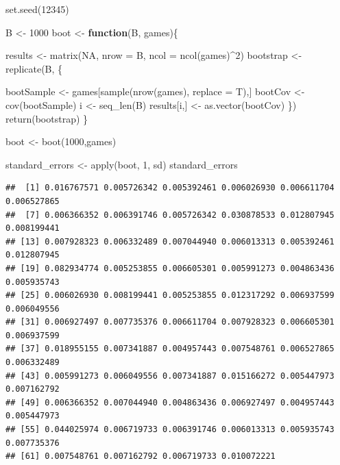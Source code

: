 \documentclass[
]{article}
\newenvironment{Shaded}{\begin{snugshade}}{\end{snugshade}}
\newcommand{\AttributeTok}[1]{\textcolor[rgb]{0.77,0.63,0.00}{#1}}
\newcommand{\ConstantTok}[1]{\textcolor[rgb]{0.00,0.00,0.00}{#1}}
\newcommand{\ControlFlowTok}[1]{\textcolor[rgb]{0.13,0.29,0.53}{\textbf{#1}}}
\newcommand{\DecValTok}[1]{\textcolor[rgb]{0.00,0.00,0.81}{#1}}
\newcommand{\FunctionTok}[1]{\textcolor[rgb]{0.00,0.00,0.00}{#1}}
\newcommand{\NormalTok}[1]{#1}
\newcommand{\OtherTok}[1]{\textcolor[rgb]{0.56,0.35,0.01}{#1}}
\newcommand{\SpecialCharTok}[1]{\textcolor[rgb]{0.00,0.00,0.00}{#1}}
\begin{document}
\begin{Shaded}
\begin{Highlighting}[]
\FunctionTok{set.seed}\NormalTok{(}\DecValTok{12345}\NormalTok{)}

\NormalTok{B }\OtherTok{\textless{}{-}} \DecValTok{1000}
\NormalTok{boot }\OtherTok{\textless{}{-}} \ControlFlowTok{function}\NormalTok{(B, games)\{}
  
\NormalTok{  results }\OtherTok{\textless{}{-}} \FunctionTok{matrix}\NormalTok{(}\ConstantTok{NA}\NormalTok{, }\AttributeTok{nrow =}\NormalTok{ B, }\AttributeTok{ncol =} \FunctionTok{ncol}\NormalTok{(games)}\SpecialCharTok{\^{}}\DecValTok{2}\NormalTok{)}
\NormalTok{  bootstrap }\OtherTok{\textless{}{-}} \FunctionTok{replicate}\NormalTok{(B, \{}
    
\NormalTok{    bootSample }\OtherTok{\textless{}{-}}\NormalTok{ games[}\FunctionTok{sample}\NormalTok{(}\FunctionTok{nrow}\NormalTok{(games), }\AttributeTok{replace =}\NormalTok{ T),]}
\NormalTok{    bootCov }\OtherTok{\textless{}{-}} \FunctionTok{cov}\NormalTok{(bootSample)}
\NormalTok{    i }\OtherTok{\textless{}{-}} \FunctionTok{seq\_len}\NormalTok{(B)}
\NormalTok{    results[i,] }\OtherTok{\textless{}{-}} \FunctionTok{as.vector}\NormalTok{(bootCov)}
\NormalTok{  \})}
  \FunctionTok{return}\NormalTok{(bootstrap)}
\NormalTok{\}}

\NormalTok{boot }\OtherTok{\textless{}{-}} \FunctionTok{boot}\NormalTok{(}\DecValTok{1000}\NormalTok{,games)}

\NormalTok{standard\_errors }\OtherTok{\textless{}{-}} \FunctionTok{apply}\NormalTok{(boot, }\DecValTok{1}\NormalTok{, sd)}
\NormalTok{standard\_errors}
\end{Highlighting}
\end{Shaded}

\begin{verbatim}
##  [1] 0.016767571 0.005726342 0.005392461 0.006026930 0.006611704 0.006527865
##  [7] 0.006366352 0.006391746 0.005726342 0.030878533 0.012807945 0.008199441
## [13] 0.007928323 0.006332489 0.007044940 0.006013313 0.005392461 0.012807945
## [19] 0.082934774 0.005253855 0.006605301 0.005991273 0.004863436 0.005935743
## [25] 0.006026930 0.008199441 0.005253855 0.012317292 0.006937599 0.006049556
## [31] 0.006927497 0.007735376 0.006611704 0.007928323 0.006605301 0.006937599
## [37] 0.018955155 0.007341887 0.004957443 0.007548761 0.006527865 0.006332489
## [43] 0.005991273 0.006049556 0.007341887 0.015166272 0.005447973 0.007162792
## [49] 0.006366352 0.007044940 0.004863436 0.006927497 0.004957443 0.005447973
## [55] 0.044025974 0.006719733 0.006391746 0.006013313 0.005935743 0.007735376
## [61] 0.007548761 0.007162792 0.006719733 0.010072221
\end{verbatim}
\end{document}
